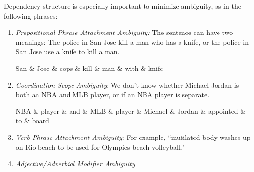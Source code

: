 \documentclass{article}
\begin{document}
      Dependency structure is especially important to minimize ambiguity, as in the following phrases: 
      \begin{enumerate}
        \item \textit{Prepositional Phrase Attachment Ambiguity: } The sentence can have two meanings: The police in San Jose kill a man who has a knife, or the police in San Jose use a knife to kill a man. 

        \begin{center}
        \begin{dependency}[theme = simple]
        \begin{deptext}[column sep=1em]
        San \& Jose \& cops \& kill \& man \& with \& knife \\
        \end{deptext}
        
        \end{dependency}
        \end{center}

        \item \textit{Coordination Scope Ambiguity}: We don't know whether Michael Jordan is both an NBA and MLB player, or if an NBA player is separate. 

        \begin{center}
        \begin{dependency}[theme = simple]
        \begin{deptext}[column sep=1em]
        NBA \& player \& and \& MLB \& player \& Michael \& Jordan \& appointed \& to \& board \\
        \end{deptext}

        \end{dependency}
        \end{center}

        \item \textit{Verb Phrase Attachment Ambiguity}: For example, ``mutilated body washes up on Rio beach to be used for Olympics beach volleyball." 

        
        \item \textit{Adjective/Adverbial Modifier Ambiguity}
      \end{enumerate}
\end{document}
